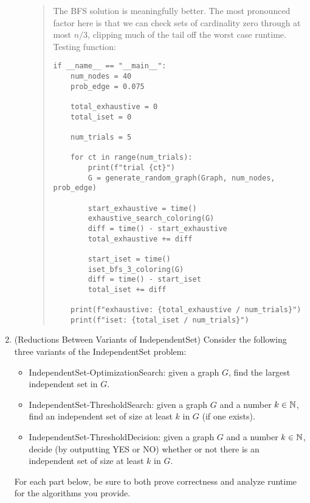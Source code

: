 \documentclass[11pt]{article}
\begin{document}
\begin{enumerate}
\begin{enumerate}
\begin{quote}
      The BFS solution is meaningfully better. The most pronounced factor here is that we can check sets of cardinality zero through at most $n / 3$, clipping much of the tail off the worst case runtime. \\

      Testing function: \\
      \begin{verbatim}
if __name__ == "__main__":
    num_nodes = 40
    prob_edge = 0.075

    total_exhaustive = 0
    total_iset = 0

    num_trials = 5

    for ct in range(num_trials):
        print(f"trial {ct}")
        G = generate_random_graph(Graph, num_nodes, prob_edge)

        start_exhaustive = time()
        exhaustive_search_coloring(G)
        diff = time() - start_exhaustive
        total_exhaustive += diff

        start_iset = time()
        iset_bfs_3_coloring(G)
        diff = time() - start_iset
        total_iset += diff

    print(f"exhaustive: {total_exhaustive / num_trials}")
    print(f"iset: {total_iset / num_trials}")
      \end{verbatim}
  \end{quote}
    
      
  \end{enumerate}

 \item (Reductions Between Variants of IndependentSet) 
 Consider the following three variants of the IndependentSet problem:
 \begin{itemize}
     \item IndependentSet-OptimizationSearch: given a graph $G$, find the largest independent set in $G$.
     \item IndependentSet-ThresholdSearch: given a graph $G$ and a number $k\in \mathbb{N}$, find an independent set of size at least $k$ in $G$ (if one exists).
     \item IndependentSet-ThresholdDecision: given a graph $G$ and a number $k\in \mathbb{N}$, decide (by outputting YES or NO) whether or not there is an independent set of size at least $k$ in $G$. 
 \end{itemize}
For each part below, be sure to both prove correctness and analyze runtime for the algorithms you provide.


\end{enumerate}
\end{document}
